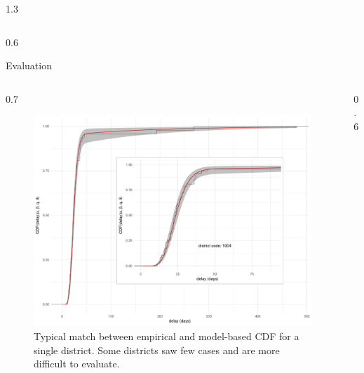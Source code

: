 \documentclass[final]{beamer}
\newlength{\onecolwid}
\begin{document}
\begin{frame}[t]
\begin{columns}[t]
\begin{column}{1.3\onecolwid}
\begin{columns}
\begin{column}{0.6\onecolwid}
\begin{block}{Evaluation}
\end{block}


\end{column}

\end{columns}


\begin{columns}
\begin{column}{0.7\onecolwid}

\begin{figure}
 \begin{center}
    \includegraphics[width=.8\textwidth]{district-plot-126}
 \end{center}
 \caption{\small Typical match between empirical and model-based CDF for a single district.  Some districts saw few cases and are more difficult to evaluate.}
\end{figure}

\end{column}

\begin{column}{0.6\onecolwid}


\end{column}
\end{columns}
\end{column}
\end{columns}
\end{frame}
\end{document}
